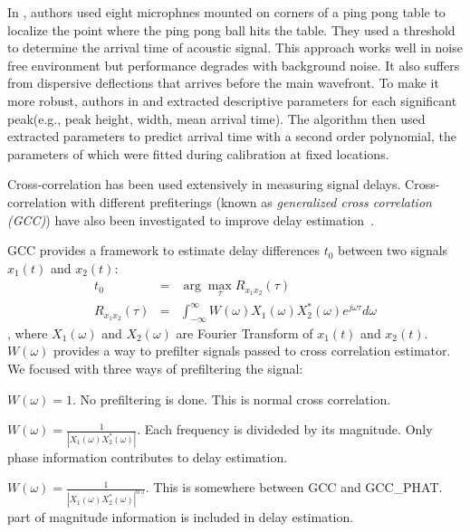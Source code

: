 In \cite{tdoa:ppp}, authors used eight microphnes mounted on corners of a ping pong table to localize the point where the ping pong ball hits the table. They used a threshold to determine the arrival time of acoustic signal. This approach works well in noise free environment but performance degrades with background noise. It also suffers from dispersive deflections that arrives before the main wavefront. To make it more robust, authors in \cite{tdoa:mit3} and \cite{tdoa:mit4} extracted descriptive parameters for each significant peak(e.g., peak height, width, mean arrival time). The algorithm then used extracted parameters to predict arrival time with a second order polynomial, the parameters of which were fitted during calibration at fixed locations.

Cross-correlation has been used extensively in measuring signal delays\cite{tdoa:mit2, tdoa:3}. Cross-correlation with different prefiterings (known as \emph{generalized cross correlation (GCC)}) have also been investigated to improve delay estimation~\cite{tdoa:gcc1,tdoa:gcc2,tdoa:gcc3}.

GCC provides a framework to estimate delay differences $t_0$ between two signals $x_1(t)$ and $x_2(t)$:
\begin{eqnarray} \label{eq:gcc}
t_0 &=& \arg\max_{\tau} R_{x_1x_2}(\tau) \\
R_{x_1x_2}(\tau) &=& \int_{-\infty}^\infty W(\omega) X_1(\omega) X_2^{*}(\omega) e^{j\omega\tau} d\omega
\end{eqnarray}
, where $X_1(\omega)$ and $X_2(\omega)$ are Fourier Transform of $x_1(t)$ and $x_2(t)$. $W(\omega)$ provides a way to prefilter signals passed to cross correlation estimator. We focused with three ways of prefiltering the signal:
\begin{description}
\item[GCC] $W(\omega) = 1$. No prefiltering is done. This is normal cross correlation.
\item[GCC\_PHAT] $W(\omega) = \frac{1}{\left|X_1(\omega)X_2^{*}(\omega)\right|}$. Each frequency is divideded by its magnitude. Only phase information contributes to delay estimation.
\item[GCC\_PHAT\_SQRT] $W(\omega) = \frac{1}{\left|X_1(\omega)X_2^*(\omega)\right|^{0.5}}$. This is somewhere between GCC and GCC\_PHAT. part of magnitude information is included in delay estimation.
\end{description}
